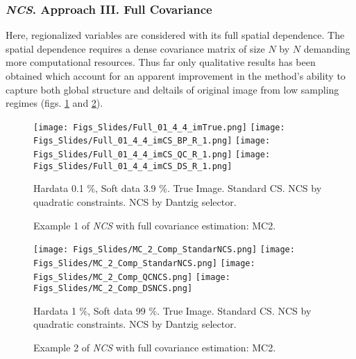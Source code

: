 \subsubsection{\emph{NCS}. Approach III. Full Covariance}

Here, regionalized variables are considered with its full spatial dependence. The spatial dependence requires a dense covariance matrix of size $N$ by $N$ demanding more computational resources. Thus far only qualitative results has been obtained which account for an apparent improvement in the method's ability to capture both global structure and deltails of original image from low sampling regimes (figs. \ref{fig:Naive2MC2_Performance_1} and \ref{fig:Naive2MC2_Performance_2}).

		\begin{figure}[H]
			\centering
			\texttt{[image: Figs\_Slides/Full\_01\_4\_4\_imTrue.png]}
			\texttt{[image: Figs\_Slides/Full\_01\_4\_4\_imCS\_BP\_R\_1.png]}
			\texttt{[image: Figs\_Slides/Full\_01\_4\_4\_imCS\_QC\_R\_1.png]}
			\texttt{[image: Figs\_Slides/Full\_01\_4\_4\_imCS\_DS\_R\_1.png]}			
		\caption{Example 1 of \emph{NCS} with full covariance estimation: MC2.}
		\scriptsize{Hardata 0.1 \%, Soft data 3.9 \%. True Image. Standard CS. NCS by quadratic constraints. NCS by Dantzig selector.}
				\label{fig:Naive2MC2_Performance_1}			
		\end{figure}


		\begin{figure}[H]
			\centering
			\texttt{[image: Figs\_Slides/MC\_2\_Comp\_StandarNCS.png]}
			\texttt{[image: Figs\_Slides/MC\_2\_Comp\_StandarNCS.png]}
			\texttt{[image: Figs\_Slides/MC\_2\_Comp\_QCNCS.png]}
			\texttt{[image: Figs\_Slides/MC\_2\_Comp\_DSNCS.png]}			
		\caption{Example 2 of \emph{NCS} with full covariance estimation: MC2.}
		\scriptsize{Hardata 1 \%, Soft data 99 \%. True Image. Standard CS. NCS by quadratic constraints. NCS by Dantzig selector.}
				\label{fig:Naive2MC2_Performance_2}					
		\end{figure}

